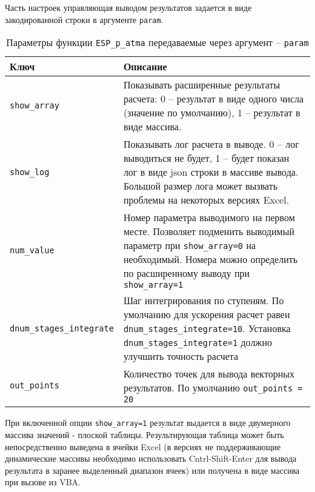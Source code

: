 
Часть настроек управляющая выводом результатов задается в виде закодированной строки в аргументе \texttt{param}.

\begin{table}[H]
	\caption{Параметры функции \texttt{ESP_p_atma} передаваемые через аргумент -- \texttt{param}}
	\label{table:param_ESP_p_atma}
	\begin{tabular}{p{}p{}}
		\hline
		Ключ & Описание  \\ \hline
		\texttt{show_array} & Показывать расширенные результаты расчета: 0 -- результат в виде одного числа (значение по умолчанию), 1 -- результат в виде массива.    \\ \hline
		
		\texttt{show_log} & Показывать лог расчета в выводе. 0 -- лог выводиться не будет, 1 -- будет показан лог в виде json строки в массиве вывода. Большой размер лога может вызвать проблемы на некоторых версиях Excel.   \\ \hline
		
		\texttt{num_value} & Номер параметра выводимого на первом месте. Позволяет подменить выводимый параметр при \texttt{show_array=0} на необходимый. Номера можно определить по расширенному выводу при \texttt{show_array=1}  \\ \hline
		
		\texttt{dnum_stages_integrate} & Шаг интегрирования по ступеням. По умолчанию для ускорения расчет равен \texttt{dnum_stages_integrate=10}. Установка \texttt{dnum_stages_integrate=1} должно улучшить точность расчета   \\ \hline
				
		\texttt{out_points} & Количество точек для вывода векторных результатов. По умолчанию \texttt{out_points = 20}   \\ \hline
	\end{tabular}
\end{table}

При включенной опции \texttt{show_array=1} результат выдается в виде двумерного массива значений - плоской таблицы. Результирующая таблица может быть непосредственно выведена в ячейки Excel (в версиях не поддерживающие динамические массивы необходимо использовать Cntrl-Shift-Enter для вывода результата в заранее выделенный диапазон ячеек) или получена в виде массива при вызове из VBA.

